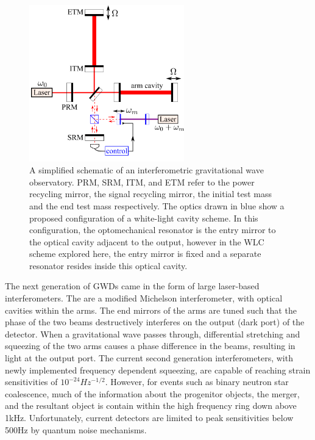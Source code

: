 \documentclass[aps,  
                a4paper, 
                amsmath, 
                amssymb, 
                preprint,
                tightenlines,  
                amsfonts,
                nofootinbib,
                onecolumn,
                titlepage,
                10pt
            ]{revtex4-2}
\begin{document}
    \begin{figure}[h]
        \centering
        \includegraphics[width=0.6\textwidth]{img/interferometer.png}
        \caption{A simplified schematic of an interferometric gravitational wave observatory. PRM, SRM, ITM, and ETM refer to the power recycling mirror, the signal recycling mirror, the initial test mass and the end test mass respectively. The optics drawn in blue show a proposed configuration of a white-light cavity scheme. In this configuration, the optomechanical resonator is the entry mirror to the optical cavity adjacent to the output, however in the WLC scheme explored here, the entry mirror is fixed and a separate resonator resides inside this optical cavity\cite{miao2015}.}
        \label{fig:resonant_bar}
    \end{figure}
    \par
    The next generation of GWDs came in the form of large laser-based interferometers. The are a modified Michelson interferometer, with optical cavities within the arms. The end mirrors of the arms are tuned such that the phase of the two beams destructively interferes on the output (dark port) of the detector. When a gravitational wave passes through, differential stretching and squeezing of the two arms causes a phase difference in the beams, resulting in light at the output port. The current second generation interferometers, with newly implemented frequency dependent squeezing, are capable of reaching strain sensitivities of $10^{-24}Hz^{-1/2}$. However, for events such as binary neutron star coalescence, much of the information about the progenitor objects, the merger, and the resultant object is contain within the high frequency ring down above 1kHz\cite{page2021}. Unfortunately, current detectors are limited to peak sensitivities below 500Hz by quantum noise mechanisms.
\end{document}
